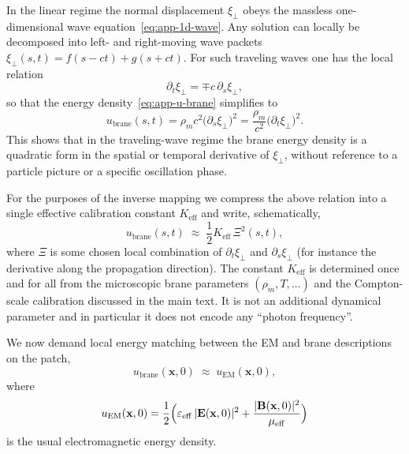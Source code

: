 In the linear regime the normal displacement $\xi_\perp$ obeys the
massless one-dimensional wave equation~\eqref{eq:app-1d-wave}. Any
solution can locally be decomposed into left- and right-moving wave
packets $\xi_\perp(s,t) = f(s-ct) + g(s+ct)$. For such traveling waves
one has the local relation
\begin{equation}
  \partial_t\xi_\perp = \mp c\,\partial_s\xi_\perp,
\end{equation}
so that the energy density~\eqref{eq:app-u-brane} simplifies to
\begin{equation}
  u_{\mathrm{brane}}(s,t)
  = \rho_m c^2\bigl(\partial_s\xi_\perp\bigr)^2
  = \frac{\rho_m}{c^2}\bigl(\partial_t\xi_\perp\bigr)^2.
\end{equation}
This shows that in the traveling-wave regime the brane energy density
is a quadratic form in the spatial or temporal derivative of
$\xi_\perp$, without reference to a particle picture or a specific
oscillation phase.

For the purposes of the inverse mapping we compress the above relation
into a single effective calibration constant $K_{\mathrm{eff}}$ and
write, schematically,
\begin{equation}
  u_{\mathrm{brane}}(s,t)
  \;\approx\;
  \frac{1}{2} K_{\mathrm{eff}}\,\Xi^2(s,t),
\end{equation}
where $\Xi$ is some chosen local combination of $\partial_t\xi_\perp$
and $\partial_s\xi_\perp$ (for instance the derivative along the
propagation direction). The constant $K_{\mathrm{eff}}$ is determined
once and for all from the microscopic brane parameters $(\rho_m,T,\dots)$
and the Compton-scale calibration discussed in the main text. It is not
an additional dynamical parameter and in particular it does not encode
any ``photon frequency''.

We now demand local energy matching between the EM and brane
descriptions on the patch,
\begin{equation}
  u_{\mathrm{brane}}(\mathbf x,0)
  \;\approx\;
  u_{\mathrm{EM}}(\mathbf x,0),
\end{equation}
where
\begin{equation}
  u_{\mathrm{EM}}(\mathbf x,0)
  = \frac{1}{2}\Bigl(
      \varepsilon_{\mathrm{eff}}\,|\mathbf E(\mathbf x,0)|^2
      + \frac{|\mathbf B(\mathbf x,0)|^2}{\mu_{\mathrm{eff}}}
    \Bigr)
  \label{eq:app-u-EM}
\end{equation}
is the usual electromagnetic energy density.

